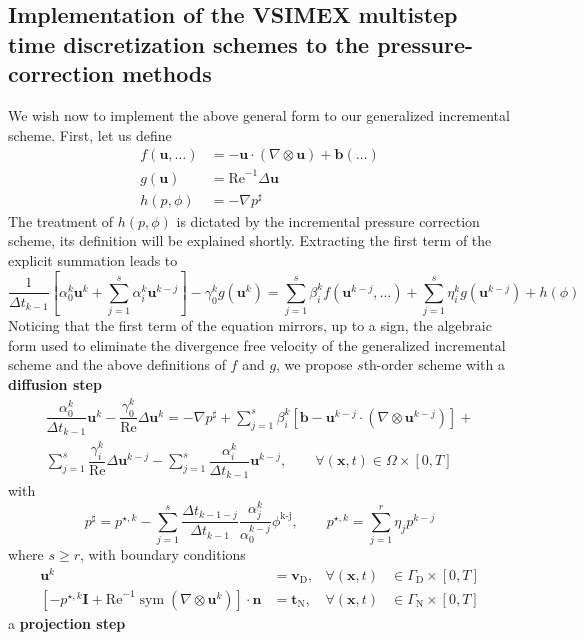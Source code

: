 \documentclass[]{scrartcl}
\newcommand{\bs}[1]{\boldsymbol{#1}}
\DeclareMathOperator{\Sym}{sym}
\begin{document}
\subsection{Implementation of the VSIMEX multistep time discretization schemes to the pressure-correction methods} We wish now to implement the above general form to our generalized incremental scheme. First, let us define
\begin{equation*}
	\begin{aligned}
		f(\bs{u}, \dots) &= -\bs{u} \cdot (\nabla \otimes \bs{u}) + \bs{b}(\dots) \\
		g(\bs{u}) &= \textrm{Re}^{-1} \Delta \bs{u} \\
		h(p, \phi)	 &= -\nabla p^\sharp
	\end{aligned}
\end{equation*}
The treatment of $h(p,\phi)$ is dictated by the incremental pressure correction scheme, its definition will be explained shortly. Extracting the first term of the explicit summation leads to
\begin{equation*}
\dfrac{1}{\Delta t_{k-1}} \left[\alpha_0^k \bs{u}^{k} + \sum_{j=1}^{s} \alpha_i^k \bs{u}^{k-j}\right] - \gamma_0^k g(\bs{u}^{k}) = \sum_{j=1}^{s} \beta_i^k f(\bs{u}^{k-j},\dots) + \sum_{j=1}^{s} \eta_i^k g(\bs{u}^{k-j}) + h(\phi)
\end{equation*}
Noticing that the first term of the equation mirrors, up to a sign, the algebraic form used to eliminate the divergence free velocity of the generalized incremental scheme and the above definitions of $f$ and $g$, we propose $s$th-order scheme with a \textbf{diffusion step}
\begin{equation}
\begin{split}\label{Eqn:VSIMEXDiffusionStep}
	\dfrac{\alpha_0^k}{\Delta t_{k-1}} \bs{u}^{k} -\dfrac{\gamma_0^k}{\textrm{Re}} \Delta \bs{u}^{k} = -\nabla p^{\sharp} + \sum_{j=1}^{s} \beta_i^k \left[ \bs{b} - \bs{u}^{k-j} \cdot (\nabla \otimes \bs{u}^{k-j})\right] + \\
	\sum_{j=1}^{s} \dfrac{\gamma_i^k}{\textrm{Re}} \Delta \bs{u}^{k-j} -   \sum_{j=1}^{s} \dfrac{\alpha_i^k}{\Delta t_{k-1}}\bs{u}^{k-j}, \qquad \forall(\bs{x},t)\in \Omega \times [0, T]
\end{split}
\end{equation}
with
\begin{equation*}
	 p^\sharp = p^{\star, k} - \sum_{j=1}^{s} \frac{\Delta t_{k-1-j}}{\Delta t_{k-1}}          \frac{\alpha_j^k}{\alpha_0^{k-j}}\phi^\textrm{k-j} ,
	 \qquad
	 p^{\star, k} = \sum_{j=1}^{r} \eta_j p^{k-j}
\end{equation*}
where $s\ge r$, with boundary conditions
\begin{equation*}
	\begin{aligned}
		\bs{u}^{k} &= \bs{v}_\textrm{D}, &\forall(\bs{x}, t) &\in \Gamma_\textrm{D} \times [0, T] \\
		[- p^{\star, k} \bs{I} + \textrm{Re}^{-1} \Sym (\nabla \otimes \bs{u}^{k})] \cdot \bs{n} &= \bs{t}_\textrm{N},  &\forall(\bs{x}, t) &\in \Gamma_\textrm{N} \times [0, T]
	\end{aligned}
\end{equation*}
a \textbf{projection step}
\end{document}

